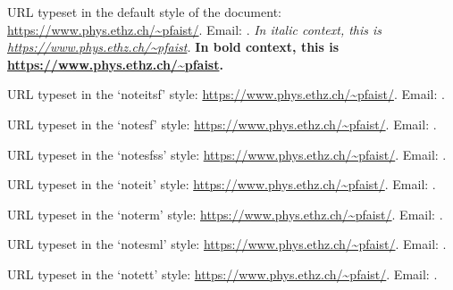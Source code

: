 \documentclass[10pt,letterpaper]{article}
\theoremstyle{plain}
\begin{document}
{%

  URL typeset in the default style of the document:
  \url{https://www.phys.ethz.ch/~pfaist/}. Email:
  .
  \textit{In italic context, this is \url{https://www.phys.ethz.ch/~pfaist}.}
  \textbf{In bold context, this is \url{https://www.phys.ethz.ch/~pfaist}.}

    URL typeset in the `noteitsf' style:
  \url{https://www.phys.ethz.ch/~pfaist/}. Email:
  .

    URL typeset in the `notesf' style:
  \url{https://www.phys.ethz.ch/~pfaist/}. Email:
  .

    URL typeset in the `notesfss' style:
  \url{https://www.phys.ethz.ch/~pfaist/}. Email:
  .

    URL typeset in the `noteit' style:
  \url{https://www.phys.ethz.ch/~pfaist/}. Email:
  .

    URL typeset in the `noterm' style:
  \url{https://www.phys.ethz.ch/~pfaist/}. Email:
  .

   URL typeset in the `notesml' style:
  \url{https://www.phys.ethz.ch/~pfaist/}. Email:
  .

    URL typeset in the `notett' style:
  \url{https://www.phys.ethz.ch/~pfaist/}. Email:
  .

}



%
%
%

\end{document}
